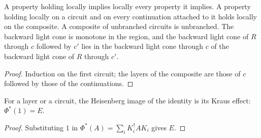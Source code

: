 \begin{lemma}
    \label{lem:circuits_local_comp}
    \leanok
    A property holding locally implies locally every property it implies. A property
    holding locally on a circuit and on every continuation attached to it holds
    locally on the composite. A composite of unbranched circuits is
    unbranched. The backward light cone is monotone in the region, and the backward
    light cone of $R$ through $c$ followed by $c'$ lies in the backward light cone
    through $c$ of the backward light cone of $R$ through $c'$.
\end{lemma}
\begin{proof}\leanok
    Induction on the first circuit; the layers of the composite are those of $c$
    followed by those of the continuations.
\end{proof}

\begin{lemma}
    \label{lem:circuits_effect_identities}
    \leanok
    For a layer or a circuit, the Heisenberg image of the identity is its
    Kraus effect: $\Phi^*(1)=E$.
\end{lemma}
\begin{proof}\leanok
    Substituting $1$ in $\Phi^*(A)=\sum_iK_i^\dagger A K_i$ gives $E$.
\end{proof}

